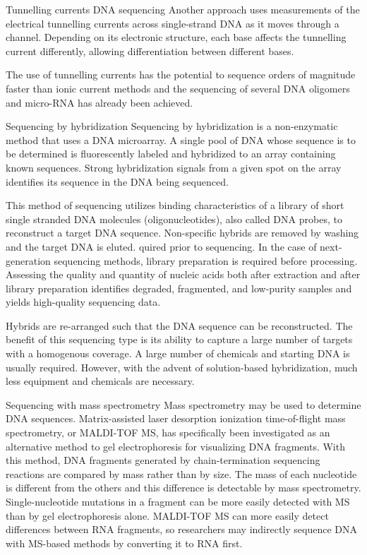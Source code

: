 Tunnelling currents DNA sequencing
Another approach uses measurements of the electrical tunnelling currents across single-strand DNA as it moves through a channel. Depending on its electronic structure, each base affects the tunnelling current differently, allowing differentiation between different bases.

The use of tunnelling currents has the potential to sequence orders of magnitude faster than ionic current methods and the sequencing of several DNA oligomers and micro-RNA has already been achieved.

Sequencing by hybridization
Sequencing by hybridization is a non-enzymatic method that uses a DNA microarray. A single pool of DNA whose sequence is to be determined is fluorescently labeled and hybridized to an array containing known sequences. Strong hybridization signals from a given spot on the array identifies its sequence in the DNA being sequenced.

This method of sequencing utilizes binding characteristics of a library of short single stranded DNA molecules (oligonucleotides), also called DNA probes, to reconstruct a target DNA sequence. Non-specific hybrids are removed by washing and the target DNA is eluted. quired prior to sequencing. In the case of next-generation sequencing methods, library preparation is required before processing. Assessing the quality and quantity of nucleic acids both after extraction and after library preparation identifies degraded, fragmented, and low-purity samples and yields high-quality sequencing data.

Hybrids are re-arranged such that the DNA sequence can be reconstructed. The benefit of this sequencing type is its ability to capture a large number of targets with a homogenous coverage. A large number of chemicals and starting DNA is usually required. However, with the advent of solution-based hybridization, much less equipment and chemicals are necessary.

Sequencing with mass spectrometry
Mass spectrometry may be used to determine DNA sequences. Matrix-assisted laser desorption ionization time-of-flight mass spectrometry, or MALDI-TOF MS, has specifically been investigated as an alternative method to gel electrophoresis for visualizing DNA fragments. With this method, DNA fragments generated by chain-termination sequencing reactions are compared by mass rather than by size. The mass of each nucleotide is different from the others and this difference is detectable by mass spectrometry. Single-nucleotide mutations in a fragment can be more easily detected with MS than by gel electrophoresis alone. MALDI-TOF MS can more easily detect differences between RNA fragments, so researchers may indirectly sequence DNA with MS-based methods by converting it to RNA first.

